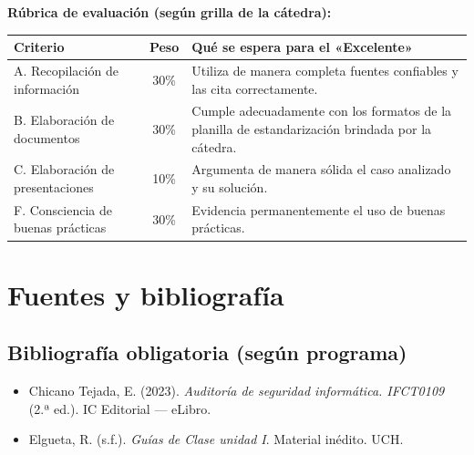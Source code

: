 \documentclass[11pt,a4paper]{article}
\begin{document}
\textbf{Rúbrica de evaluación (según grilla de la cátedra):}
\begin{center}
\renewcommand{\arraystretch}{1.2}
\begin{tabularx}{\textwidth}{@{} l c X @{}}
\toprule
\textbf{Criterio} & \textbf{Peso} & \textbf{Qué se espera para el «Excelente»} \\
\midrule
A. Recopilación de información & 30\% & Utiliza de manera completa fuentes confiables y las cita correctamente. \\
B. Elaboración de documentos & 30\% & Cumple adecuadamente con los formatos de la planilla de estandarización brindada por la cátedra. \\
C. Elaboración de presentaciones & 10\% & Argumenta de manera sólida el caso analizado y su solución. \\
F. Consciencia de buenas prácticas & 30\% & Evidencia permanentemente el uso de buenas prácticas. \\
\bottomrule
\end{tabularx}
\end{center}

\section{Fuentes y bibliografía}

\subsection{Bibliografía obligatoria (según programa)}
\begin{itemize}[leftmargin=*]
  \item Chicano Tejada, E. (2023). \textit{Auditoría de seguridad informática. IFCT0109} (2.ª ed.). IC Editorial --- eLibro.
  \item Elgueta, R. (s.f.). \textit{Guías de Clase unidad I}. Material inédito. UCH.
\end{itemize}
\end{document}
